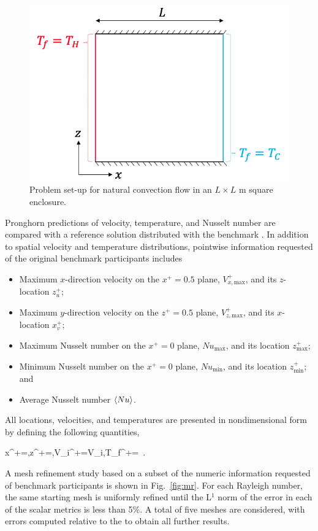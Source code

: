 \begin{figure}[!h]
\centering
\includegraphics[width=0.5\linewidth]{figs/rb_cell.png}
\caption{Problem set-up for natural convection flow in an \(L\times L\) \si{\meter} square enclosure.}
\label{fig:rb_cell}
\end{figure}

Pronghorn predictions of velocity, temperature, and Nusselt number are compared with a reference solution distributed with the benchmark \cite{davis}. In addition to spatial velocity and temperature distributions, pointwise information requested of the original benchmark participants includes

\begin{itemize}
\itemsep0em
\item Maximum \(x\)-direction velocity on the \(x^+=0.5\) plane, \(V^+_{x,\text{max}}\), and its \(z\)-location \(z^+_u\);
\item Maximum \(y\)-direction velocity on the \(z^+=0.5\) plane, \(V^+_{z,\text{max}}\), and its \(x\)-location \(x^+_v\);
\item Maximum Nusselt number on the \(x^+=0\) plane, \(Nu_\text{max}\), and its location \(z^+_\text{max}\);
\item Minimum Nusselt number on the \(x^+=0\) plane, \(Nu_\text{min}\), and its location \(z^+_\text{min}\); and
\item Average Nusselt number \(\langle Nu\rangle\).
\end{itemize}

All locations, velocities, and temperatures are presented in nondimensional form by defining the following quantities,

\beq
\label{eq:nondim_x}
x^+=,\quad z^+=,\quad V_i^+=V_i,\quad T_f^+=\ .
\eeq

\noindent A mesh refinement study based on a subset of the numeric information requested of benchmark participants is shown in Fig.\ \ref{fig:mr}. For each Rayleigh number, the same starting mesh is uniformly refined until the L$^1$ norm of the error in each of the scalar metrics is less than 5\%. A total of five meshes are considered, with errors computed relative to the to obtain all further results.

